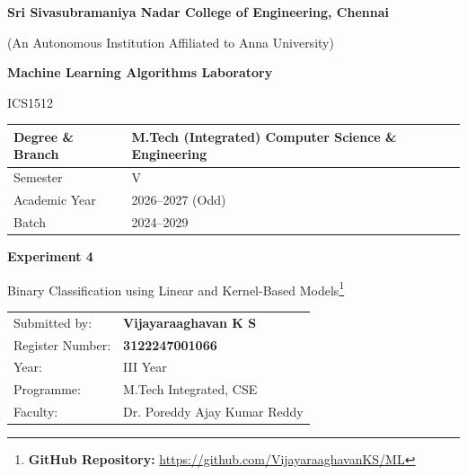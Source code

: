\documentclass[11pt,a4paper]{article}
\title{}
\date{}
\begin{document}
\begin{titlepage}
\centering
\vspace*{1cm}
{\Large\bfseries Sri Sivasubramaniya Nadar College of Engineering, Chennai\par}
\vspace{0.2cm}
{\normalsize (An Autonomous Institution Affiliated to Anna University)\par}
\vspace{1.2cm}

{\Large\bfseries Machine Learning Algorithms Laboratory\par}
\vspace{0.3cm}
{\large ICS1512\par}
\vspace{1.5cm}

\begin{tabular}{|p{5.5cm}|p{7cm}|}
\hline
Degree \& Branch & M.Tech (Integrated) Computer Science \& Engineering \\
\hline
Semester & V \\
\hline
Academic Year & 2026--2027 (Odd) \\
\hline
Batch & 2024--2029 \\
\hline
\end{tabular}

\vspace{1.8cm}
{\Large\bfseries Experiment 4\par}
\vspace{0.3cm}
{\large Binary Classification using Linear and Kernel-Based Models\footnote{\textbf{GitHub Repository: }\url{https://github.com/VijayaraaghavanKS/ML}}\par}
\vspace{2.5cm}

\begin{tabular}{ll}
Submitted by: & \textbf{Vijayaraaghavan K S} \\[4pt]
Register Number: & \textbf{3122247001066} \\[4pt]
Year: & III Year \\[4pt]
Programme: & M.Tech Integrated, CSE \\[4pt]
Faculty: & Dr. Poreddy Ajay Kumar Reddy \\[4pt]
\end{tabular}

\vfill
\end{titlepage}

\tableofcontents
\newpage
\end{document}
